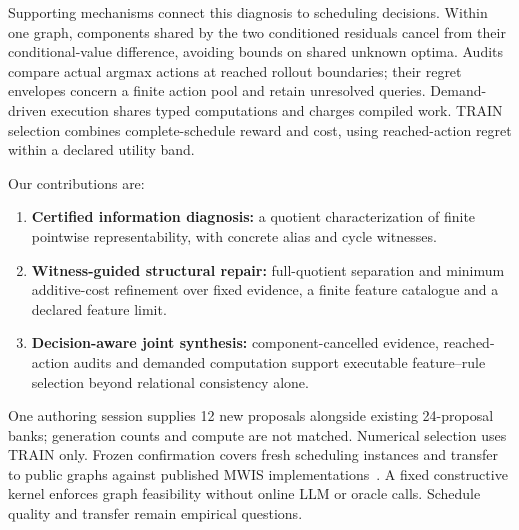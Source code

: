 Supporting mechanisms connect this diagnosis to scheduling decisions.
Within one graph, components shared by the two conditioned residuals cancel
from their conditional-value difference, avoiding bounds on shared unknown optima.
Audits compare actual argmax actions at reached rollout boundaries; their
regret envelopes concern a finite action pool and retain unresolved queries.
Demand-driven execution shares typed computations and charges compiled
work. TRAIN selection combines complete-schedule reward and cost, using
reached-action regret within a declared utility band.

Our contributions are:
\begin{enumerate}
\item \textbf{Certified information diagnosis:} a quotient characterization
of finite pointwise representability, with concrete alias and cycle witnesses.
\item \textbf{Witness-guided structural repair:} full-quotient separation
and minimum additive-cost refinement over fixed evidence, a finite feature
catalogue and a declared feature limit.
\item \textbf{Decision-aware joint synthesis:} component-cancelled evidence,
reached-action audits and demanded computation support executable
feature--rule selection beyond relational consistency alone.
\end{enumerate}

One authoring session supplies 12 new proposals alongside existing
24-proposal banks; generation counts and compute are not matched.
Numerical selection uses TRAIN only. Frozen confirmation covers fresh
scheduling instances and transfer to public graphs against published MWIS
implementations~\cite{lamm2019weighted,gellner2021struction,
grossmann2024mmwis,grossmann2025chils}. A fixed constructive kernel enforces
graph feasibility without online LLM or oracle calls. Schedule quality
and transfer remain empirical questions.
